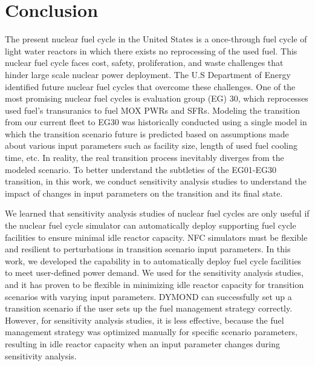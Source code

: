\chapter{Conclusion}
The present nuclear fuel cycle in the United States is a once-through 
fuel cycle of light water reactors in which there exists no reprocessing 
of the used fuel. 
This nuclear fuel cycle faces cost, safety, proliferation, and waste 
challenges that hinder large scale nuclear power deployment. 
The U.S Department of Energy identified future 
nuclear fuel cycles that overcome these challenges.  
One of the most promising nuclear fuel cycles is evaluation group (EG) 30, 
which reprocesses used fuel's transuranics to fuel \gls{MOX} \glspl{PWR}
and \glspl{SFR}. 
Modeling the transition from our current fleet to EG30 was historically 
conducted using a single model in which the transition scenario future 
is predicted based on assumptions made about various input parameters 
such as facility size, length of used fuel cooling time, etc. 
In reality, the real transition process inevitably diverges from the 
modeled scenario. 
To better understand the subtleties of the EG01-EG30 transition,
in this work, we conduct sensitivity analysis studies to 
understand the impact of changes in input parameters on the transition 
and its final state. 

We learned that sensitivity analysis studies of nuclear fuel cycles 
are only useful if the nuclear fuel cycle simulator can 
automatically deploy supporting fuel cycle facilities 
to ensure minimal idle reactor capacity. 
NFC simulators must be flexible and resilient to 
perturbations in transition scenario input parameters. 
In this work, we developed the \deploy capability in \Cyclus to 
automatically deploy fuel cycle facilities to meet user-defined 
power demand. 
We used \deploy for the sensitivity analysis studies, and it has 
proven to be flexible in minimizing idle reactor capacity for 
transition scenarios with varying input parameters. 
DYMOND can successfully set up a transition scenario if the 
user sets up the fuel management strategy correctly. 
However, for sensitivity analysis studies, it is less effective, 
because the fuel management strategy was optimized manually for specific 
scenario parameters, resulting in idle reactor capacity when 
an input parameter changes during sensitivity analysis.

